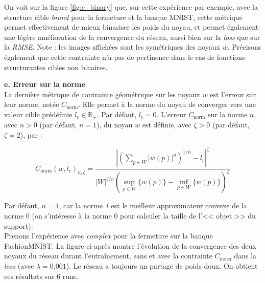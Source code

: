 \vspace{-2.6mm}
\noindent On voit sur la figure \ref{fig:c_binary} que, sur cette expérience par exemple, avec la structure cible \textit{brand} pour la fermeture et la banque MNIST, cette métrique permet effectivement de mieux binariser les poids du noyau, et permet également une légère amélioration de la convergence du réseau, aussi bien sur la \textit{loss} que sur la \textit{RMSE}. Note : les images affichées sont les symétriques des noyaux $w$.
Précisons également que cette contrainte n'a pas de pertinence dans le cas de fonctions structurantes cibles non binaires.



\newpage

\noindent \textbf{e. Erreur sur la norme}\\

La dernière métrique de contrainte géométrique sur les noyaux $w$ est l'erreur sur leur norme, notée $C_\text{norm}$. Elle permet à la norme du noyau de converger vers une valeur cible prédéfinie $l_c \in \mathbb{R}_+$. Par défaut, $l_c = 0$. L'erreur $C_\text{norm}$ sur la norme $n$, avec $n > 0$ (par défaut, $n = 1$), du noyau $w$ est définie, avec $\zeta > 0$ (par défaut, $\zeta = 2$), par :

\begin{equation}
    C_\text{norm}(w, l_c)_{n,\zeta} = 
    \frac
    { \left | 
    \left ( \sum_{p \in W} \left | w(p) \right | ^n \right ) ^{1/n} - l_c
    \right | ^\zeta }
    { |W| ^ {\zeta/n} \left ( \sup_{p \in W} \{ w(p) \} - \inf_{p \in W} \{ w(p) \} \right ) ^\zeta } 
    \label{erreur_norm}
\end{equation}

\vspace{4.5mm}
Par défaut, $n = 1$, car la norme \textit{1} est le meilleur approximateur convexe de la norme $0$ (on s'intéresse à la norme $0$ pour calculer la taille de l'<< objet >> du support). \\

\vspace{-2.6mm}
\noindent Prenons l'expérience avec \textit{complex} pour la fermeture sur la banque FashionMNIST. La figure ci-après montre l'évolution de la convergence des deux noyaux du réseau durant l'entraînement, sans et avec la contrainte $C_\text{norm}$ dans la \textit{loss} (avec $\lambda = 0.001$). Le réseau a toujours un partage de poids doux. On obtient ces résultats sur 6 runs. \\

